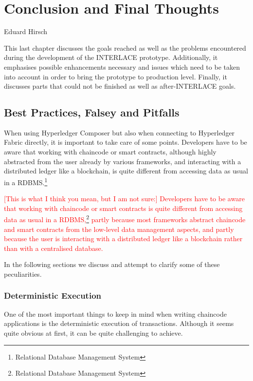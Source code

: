 \chapter{Conclusion and Final Thoughts}
\label{ch:conclusion}

\vspace{-1cm}
\begin{center}
Eduard Hirsch
\end{center}

This last chapter discusses the goals reached as well as the problems encountered during the development of the INTERLACE prototype. Additionally, it emphasises possible enhancements necessary and issues which need to be taken into account in order to bring the prototype to production level. Finally, it discusses parts that could not be finished as well as after-INTERLACE goals.

\section{Best Practices, Falsey and Pitfalls}

When using Hyperledger Composer but also when connecting to Hyperledger Fabric directly, it is important to take care of some points. Developers have to be aware that working with chaincode or smart contracts, although highly abstracted from the user already by various frameworks, and interacting with a distributed ledger like a blockchain, is quite different from accessing data as usual in a RDBMS.\footnote{Relational Database Management System}

\textcolor{red}{[This is what I think you mean, but I am not sure:] Developers have to be aware that working with chaincode or smart contracts is quite different from accessing data as usual in a RDBMS,\footnote{Relational Database Management System} partly because most frameworks abstract chaincode and smart contracts from the low-level data management aspects, and partly because the user is interacting with a distributed ledger like a blockchain rather than with a centralised database.}

In the following sections we discuss and attempt to clarify some of these peculiarities.

\subsection{Deterministic Execution}

One of the most important things to keep in mind when writing chaincode applications is the deterministic execution of transactions. Although it seems quite obvious at first, it can be quite challenging to achieve.

